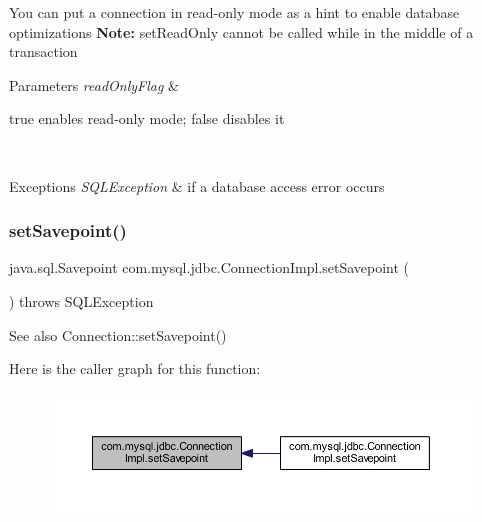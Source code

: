 You can put a connection in read-\/only mode as a hint to enable database optimizations {\bfseries Note\+:} set\+Read\+Only cannot be called while in the middle of a transaction


\begin{DoxyParams}{Parameters}
{\em read\+Only\+Flag} & 
\begin{DoxyItemize}
\item true enables read-\/only mode; false disables it 
\end{DoxyItemize}\\
\hline
\end{DoxyParams}

\begin{DoxyExceptions}{Exceptions}
{\em S\+Q\+L\+Exception} & if a database access error occurs \\
\hline
\end{DoxyExceptions}
\mbox{\label{classcom_1_1mysql_1_1jdbc_1_1_connection_impl_ac4302ad8b26bd780dc6c3c3219924b76}} 
\subsubsection{\texorpdfstring{set\+Savepoint()}{setSavepoint()}\hspace{0.1cm}{\footnotesize\ttfamily [1/2]}}
{\footnotesize\ttfamily java.\+sql.\+Savepoint com.\+mysql.\+jdbc.\+Connection\+Impl.\+set\+Savepoint (\begin{DoxyParamCaption}{ }\end{DoxyParamCaption}) throws S\+Q\+L\+Exception}

\begin{DoxySeeAlso}{See also}
Connection\+::set\+Savepoint() 
\end{DoxySeeAlso}
Here is the caller graph for this function\+:\nopagebreak
\begin{figure}[H]
\begin{center}
\leavevmode
\includegraphics[width=350pt]{classcom_1_1mysql_1_1jdbc_1_1_connection_impl_ac4302ad8b26bd780dc6c3c3219924b76_icgraph}
\end{center}
\end{figure}
\mbox{\label{classcom_1_1mysql_1_1jdbc_1_1_connection_impl_a50c5912b1869b1ee14920da16cf3259b}} 
